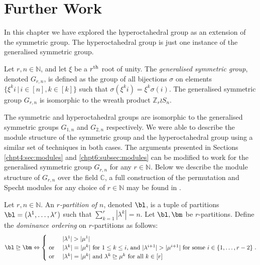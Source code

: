 \documentclass[11pt]{report}
\begin{document}
\section{Further Work}

In this chapter we have explored the hyperoctahedral group as an extension of the symmetric group. The hyperoctahedral group is just one instance of the generalised symmetric group.


\begin{defn}
	Let $r,n \in \mathbb{N}$, and let $\xi$ be a $r^\textnormal{th}$ root of unity. The \emph{generalised symmetric group}, denoted $G_{r,n}$, is defined as the group of all bijections $\sigma$ on elements $\{ \xi^{k} i \, | \, i \in [n],k\in[k]\}$ such that $\sigma(\xi^{k} i ) = \xi^{k} \sigma(i)$. The generalised symmetric group $G_{r,n}$ is isomorphic to the wreath product $\mathbb{Z}_{r} \wr S_{n}$.
\end{defn}



The symmetric and hyperoctahedral groups are isomorphic to the generalised symmetric groups $G_{1,n}$ and $G_{2,n}$ respectively.
We were able to describe the module structure of the symmetric group and the hyperoctahedral group using a similar set of techniques in both cases.  The arguments presented in Sections  \ref{chpt4:sec:modules} and \ref{chpt6:subsec:modules} can be modified to work for the generalised symmetric group $G_{r,n}$ for any $r \in\mathbb{N}$. Below we describe the module structure of $G_{r,n}$ over the field $\mathbb{C}$, a full construction of the permutation and Specht modules for any choice of $r \in \mathbb{N}$ may be found in \cite{can1996representations}.

\begin{defn}
	Let $r,n\in\mathbb{N}$. An \emph{$r$-partition of $n$}, denoted $\bl$, is a tuple of partitions $\bl = (\lambda^{1},\ldots, \lambda^{r})$ such that $\sum_{k=1}^{r}|\lambda^{k}| = n$.	Let $\bl,\bm$ be $r$-partitions. Define the \emph{dominance ordering} on $r$-partitions as follows:
	\[\bl \trianglerighteq \bm \Leftrightarrow \begin{cases}
	& |\lambda^{1}| >  |\mu^{1}| \\
	\textnormal{ or } & |\lambda^{k}| = |\mu^{k}| \textnormal{ for  $1\leq k \leq i$, and } |\lambda^{i+1}| > |\mu^{i+1}| \textnormal{ for some }  i\in \{1,\ldots,r-2\} \\
	\textnormal{ or } & |\lambda^{k}| = |\mu^{k}| \textnormal{ and } \lambda^{k} \trianglerighteq \mu^{k} \textnormal{ for all $k \in [r]$} 
	\end{cases}
	.\]
	
\end{defn}
\end{document}
